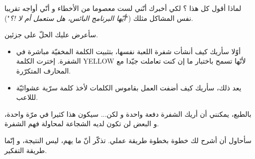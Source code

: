 لماذا أقول كل هذا ؟ لكي أخبرك أنّني لست معصوما من الأخطاء و أنّي أواجه تقريبا نفس المشاكل مثلك
("\textit{أيّها البرنامج البائس، هل ستعمل أم لا !؟}").

سأعرض عليك الحلّ على جزئين.
\begin{itemize}
  \item أوّلا سأريك كيف أنشأت شفرة اللعبة نفسها، بتثبيت الكلمة المخفيّة مباشرة في الشفرة. إخترت الكلمة
\textenglish{YELLOW}
لأنّها تسمح باختبار ما إن كنت تعاملت جيّدا مع المحارف المتكرّرة.
  \item يعد ذلك، سأريك كيف أضفت العمل بقاموس الكلمات لأخذ كلمة سرّية عشوائيّة لللاعب.
\end{itemize}

بالطبع، يمكنني أن أريك الشفرة دفعة واحدة و لكن... سيكون هذا كثيرا في مرّة واحدة، و البعض لن تكون لديه الشجاعة لمحاولة فهم الشفرة.

سأحاول أن أشرح لك خطوة بخطوة طريقة عملي. تذكّر أنّ ما يهم، ليس النتيجة، و إنّما طريقة التفكير.
